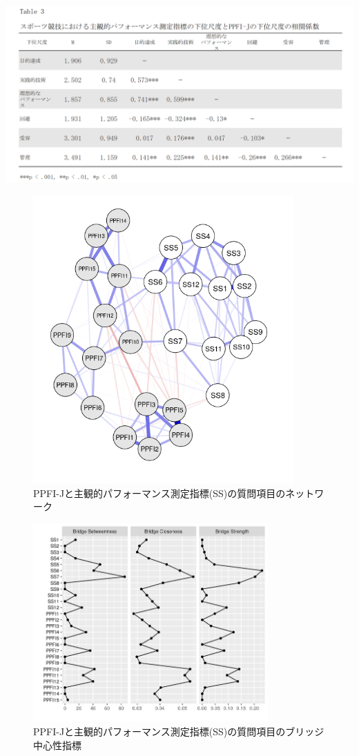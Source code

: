 \documentclass[12pt,a4paper,xelatex,ja=standard]{bxjsarticle}
\begin{document}
\includegraphics{figure/table3.png}

\setcounter{figure}{1} 
\begin{figure}[H]
\centering
\includegraphics[clip,width = 10cm]{figure/SS-PPFI.png}
\caption{PPFI-Jと主観的パフォーマンス測定指標(SS)の質問項目のネットワーク}
\end{figure}

\begin{figure}[H]
\centering
\includegraphics[clip,width = 9cm]{figure/ss-ppfi_B.png}
\caption{PPFI-Jと主観的パフォーマンス測定指標(SS)の質問項目のブリッジ中心性指標}
\end{figure}
\end{document}
